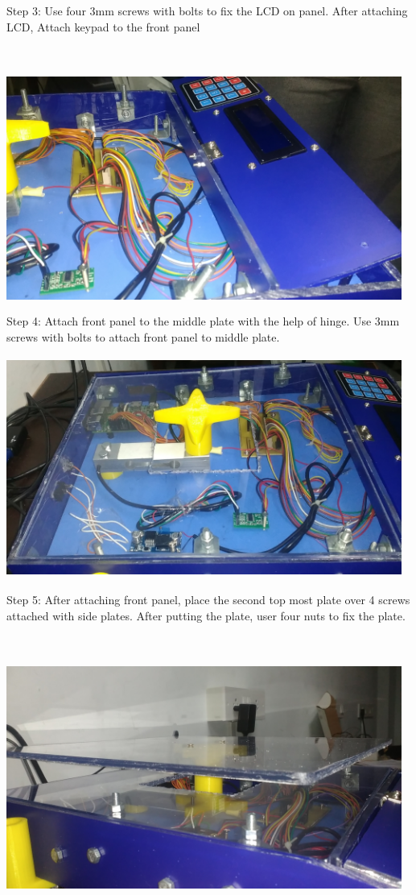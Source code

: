 \documentclass[a4paper,12pt,oneside]{book}
\begin{document}
Step 3: Use four 3mm screws with bolts to fix the LCD on panel. After attaching LCD, Attach keypad to the front panel\\\\\\
\includegraphics[height=8cm,width=13cm]{4.jpg}\\
Step 4: Attach front panel to the middle plate with the help of hinge. Use 3mm screws with bolts to attach front panel to middle plate.\\
\includegraphics[height=8cm,width=13cm]{5.jpg}\\
Step 5: After attaching front panel, place the second top most plate over 4 screws attached with side plates. After
putting the plate, user four nuts to fix the plate.\\\\\\
\includegraphics[height=8cm,width=13cm]{6.jpg}\\ 
\end{document}
